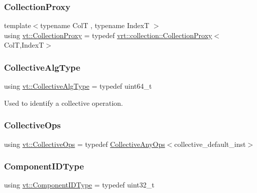 \subsubsection{\texorpdfstring{Collection\+Proxy}{CollectionProxy}}
{\footnotesize\ttfamily template$<$typename ColT , typename IndexT $>$ \\
using \hyperlink{namespacevt_a0d58a693bfb96e0ce5d145692a1a1f98}{vt\+::\+Collection\+Proxy} = typedef \hyperlink{structvt_1_1vrt_1_1collection_1_1_collection_proxy}{vrt\+::collection\+::\+Collection\+Proxy}$<$ColT,IndexT$>$}

\mbox{\label{namespacevt_a5ffcf8e168b77b0f36e11b616049a1cf}} 
\subsubsection{\texorpdfstring{Collective\+Alg\+Type}{CollectiveAlgType}}
{\footnotesize\ttfamily using \hyperlink{namespacevt_a5ffcf8e168b77b0f36e11b616049a1cf}{vt\+::\+Collective\+Alg\+Type} = typedef uint64\+\_\+t}



Used to identify a collective operation. 

\mbox{\label{namespacevt_a776b30f114cff62549e798fedeb6222b}} 
\subsubsection{\texorpdfstring{Collective\+Ops}{CollectiveOps}}
{\footnotesize\ttfamily using \hyperlink{namespacevt_a776b30f114cff62549e798fedeb6222b}{vt\+::\+Collective\+Ops} = typedef \hyperlink{structvt_1_1_collective_any_ops}{Collective\+Any\+Ops}$<$collective\+\_\+default\+\_\+inst$>$}

\mbox{\label{namespacevt_ab6ac935c168b809c422d5121da4f2700}} 
\subsubsection{\texorpdfstring{Component\+I\+D\+Type}{ComponentIDType}}
{\footnotesize\ttfamily using \hyperlink{namespacevt_ab6ac935c168b809c422d5121da4f2700}{vt\+::\+Component\+I\+D\+Type} = typedef uint32\+\_\+t}




